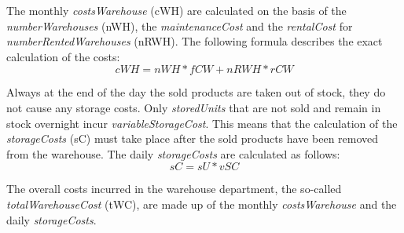 The monthly \textit{costsWarehouse} (\gls{cWH}) are calculated on the basis of the \textit{numberWarehouses} (\gls{nWH}), the \textit{maintenanceCost} and the \textit{rentalCost} for \textit{numberRentedWarehouses} (\gls{nRWH}). The following formula describes the exact calculation of the costs:
\begin{equation}
\label{func:cWH} %
     cWH = nWH * fCW + nRWH * rCW
\end{equation}

Always at the end of the day the sold products are taken out of stock, they do not cause any storage costs. Only \textit{storedUnits} that are not sold and remain in stock overnight incur \textit{variableStorageCost}. This means that the calculation of the \textit{storageCosts} (\gls{sC}) must take place after the sold products have been removed from the warehouse. The daily \textit{storageCosts} are calculated as follows:
\begin{equation}
\label{func:SC} %
    sC = sU * vSC
\end{equation}

The overall costs incurred in the warehouse department, the so-called \textit{totalWarehouseCost} (\gls{tWC}), are made up of the monthly \textit{costsWarehouse} and the daily \textit{storageCosts}. 